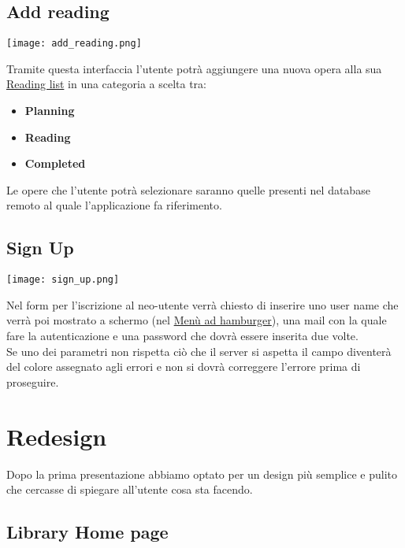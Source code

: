 \documentclass[../Assignment-3-LPSMT.tex]{subfiles}
\begin{document}
\subsection{Add reading}

\begin{center}
   \texttt{[image: add\_reading.png]}
\end{center}

Tramite questa interfaccia l'utente potrà aggiungere una nuova opera alla sua \hyperref[sec:reading_list]{Reading list} in una categoria a scelta tra:
\begin{itemize}
   \item \textbf{Planning}
   \item \textbf{Reading}
   \item \textbf{Completed}
\end{itemize}
Le opere che l'utente potrà selezionare saranno quelle presenti nel database remoto al quale l'applicazione fa riferimento.

\subsection{Sign Up}

\begin{center}
   \texttt{[image: sign\_up.png]}
\end{center}

Nel form per l'iscrizione al neo-utente verrà chiesto di inserire uno user name che verrà poi mostrato a schermo (nel \hyperref[sec:hamburger]{Menù ad hamburger}), una mail con la quale fare la autenticazione e una password che dovrà essere inserita due volte.\\
Se uno dei parametri non rispetta ciò che il server si aspetta il campo diventerà del colore assegnato agli errori e non si dovrà correggere l'errore prima di proseguire.

\section{Redesign}

Dopo la prima presentazione abbiamo optato per un design più semplice e pulito che cercasse di spiegare all'utente cosa sta facendo.

\subsection{Library Home page}\label{sec:home_redesign}
\end{document}
